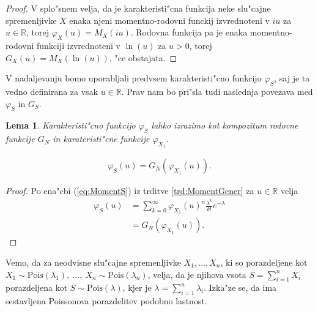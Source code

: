 \documentclass[12pt, a4paper, reqno]{amsart}
\theoremstyle{definition}
\theoremstyle{plain}
\newtheorem{lema}[definicija]{Lema}
\newcommand{\R}{\mathbb{R}}
\newcommand{\1}{\mathds{1}}
\newcommand{\Pois}[1]{\text{Pois}(#1)}
\begin{document}
    \begin{proof}
    V splo"snem velja, da je karakteristi"cna funkcija neke slu"cajne spremenljivke $X$ enaka
    njeni momentno-rodovni funckij izvrednoteni v $iu$ za $u\in\R$, torej $\varphi_X(u) = M_X(iu)$. Rodovna funkcija
    pa je enaka momentno-rodovni funkciji izvrednoteni v $\ln(u)$ za $u>0$, torej 
    $G_X(u) = M_X\left(\ln(u)\right)$, "ce obstajata.
    \end{proof}

    V nadaljevanju bomo uporabljali predvsem karakteristi"cno funkcijo $\varphi_S$, saj je ta vedno definirana 
    za vsak $u\in\R$. Prav nam bo pri"sla tudi naslednja povezava med $\varphi_S$ in $G_S$. 

    \begin{lema}
        Karakteristi"cno funkcijo $\varphi_S$ lahko izrazimo kot kompozitum rodovne funkcije $G_N$ in 
        karateristi"cne funkcije $\varphi_{X_1}$.

        \begin{align*}
            \varphi_{S}(u) = G_{N}\left(\varphi_{X_1}(u)\right).
        \end{align*}

        \label{lema:povezavaRodovneKarkateristicne}
    \end{lema}

    \begin{proof}
        Po ena"cbi (\ref{eq:MomentS}) iz trditve \ref{trd:MomentGener} za $u\in\R$ velja
        \begin{align*}
            \varphi_{S}(u) &= \sum_{k=0}^{\infty}
            \varphi_{X_1}(u)^n\frac{\lambda^k}{k!}e^{-\lambda} \\
            &= G_{N}\left(\varphi_{X_1}(u)\right).
        \end{align*}
    \end{proof}

    Vemo, da za neodvisne slu"cajne spremenljivke $X_1,  \dots, X_n$, ki so porazdeljene 
    kot $X_1\sim\Pois{\lambda_1}, \ \dots, \ X_n\sim\Pois{\lambda_n}$, 
    velja, da je njihova vsota $S = \sum_{i=1}^nX_i$ porazdeljena kot $S\sim\Pois{\lambda}$, kjer je
    $\lambda = \sum_{i=1}^n\lambda_i$.
    Izka"ze se, da ima sestavljena Poissonova porazdelitev 
    podobno lastnost.
\end{document}
